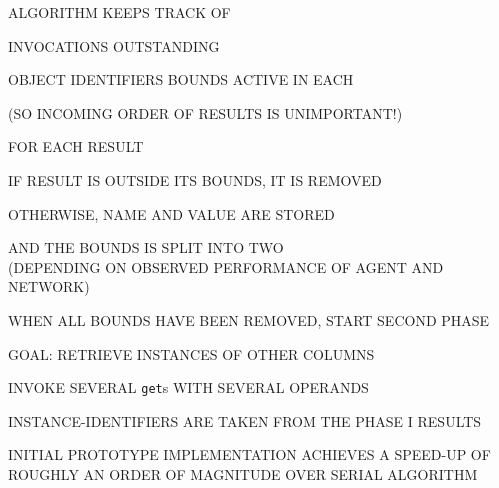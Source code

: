 \begin{bwslide}

\begin{nrtc}
\item	ALGORITHM KEEPS TRACK OF
    \begin{nrtc}
    \item	INVOCATIONS OUTSTANDING

    \item	OBJECT IDENTIFIERS BOUNDS ACTIVE IN EACH
    \end{nrtc}
    (SO INCOMING ORDER OF RESULTS IS UNIMPORTANT!)

\item	FOR EACH RESULT
    \begin{nrtc}
    \item	IF RESULT IS OUTSIDE ITS BOUNDS, IT IS REMOVED

    \item	OTHERWISE, NAME AND VALUE ARE STORED

    \item	AND THE BOUNDS IS SPLIT INTO TWO\\
		(DEPENDING ON OBSERVED PERFORMANCE OF AGENT AND NETWORK)
    \end{nrtc}

\item	WHEN ALL BOUNDS HAVE BEEN REMOVED, START SECOND PHASE
\end{nrtc}
\end{bwslide}


\begin{bwslide}

\begin{nrtc}
\item	GOAL: RETRIEVE INSTANCES OF OTHER COLUMNS

\item	INVOKE SEVERAL \verb"get"s WITH SEVERAL OPERANDS

\item	INSTANCE-IDENTIFIERS ARE TAKEN FROM THE PHASE I RESULTS

\item	INITIAL PROTOTYPE IMPLEMENTATION ACHIEVES A SPEED-UP OF ROUGHLY AN
	ORDER OF MAGNITUDE OVER SERIAL ALGORITHM
\end{nrtc}
\end{bwslide}



